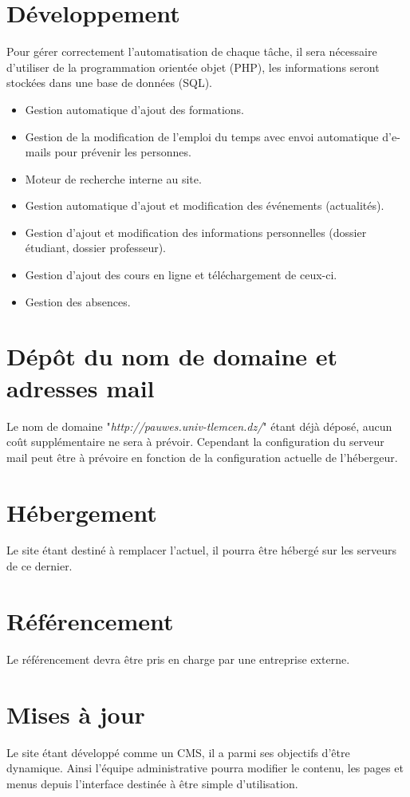 \documentclass[oneside]{report}
\begin{document}
{		\section{Développement}
		\par Pour gérer correctement l’automatisation de chaque tâche, il sera nécessaire d’utiliser de la programmation orientée objet (PHP), les informations seront stockées dans une base de données (SQL).
		\par
		\begin{itemize}
			\item Gestion automatique d’ajout des formations.
			\item Gestion de la modification de l’emploi du temps avec envoi automatique d'e-mails pour prévenir les personnes.
			\item Moteur de recherche interne au site.
			\item Gestion automatique d’ajout et modification des événements (actualités).
			\item Gestion d'ajout et modification des informations personnelles (dossier étudiant, dossier professeur).
			\item Gestion d’ajout des cours en ligne et téléchargement de ceux-ci.
			\item Gestion des absences.
		\end{itemize}
		\section{Dépôt du nom de domaine et adresses mail}
		{
			\par Le nom de domaine "\textit{http://pauwes.univ-tlemcen.dz/}" étant déjà déposé, aucun coût supplémentaire ne sera à prévoir. Cependant la configuration du serveur mail peut être à prévoire en fonction de la configuration actuelle de l'hébergeur.
		}
		\section{Hébergement}
		{
			\par Le site étant destiné à remplacer l'actuel, il pourra être hébergé sur les serveurs de ce dernier.
		}
		\section{Référencement}
		{
			Le référencement devra être pris en charge par une entreprise externe.
		}
		
		\section{Mises à jour}
		{
			\par Le site étant développé comme un CMS, il a parmi ses objectifs d’être dynamique. Ainsi l’équipe administrative pourra modifier le contenu, les pages et menus depuis l’interface destinée à être simple d’utilisation.
		}
	}
	
\end{document}
